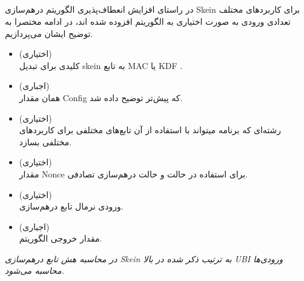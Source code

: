\subsection{}

در راستای افزایش انعطاف‌پذیری الگوریتم درهم‌سازی Skein برای کاربردهای مختلف تعدادی ورودی به صورت اختیاری به الگوریتم افزوده شده اند، در ادامه مختصرا به توضیح ایشان می‌پردازیم. 
\begin{itemize}
	\item
	      \textbf{}
	      (اختیاری)\\
	      کلیدی برای تبدیل skein
	      به تابع MAC یا KDF
	      .
	\item
	      \textbf{}
	      (اجباری)\\
	      همان مقدار Config که پیش‌تر توضیح داده شد. 
	\item
	      \textbf{}
	      (اختیاری)\\
	      رشته‌ای که برنامه میتواند با استفاده از آن تابع‌های مختلفی برای کاربردهای مختلفی بسازد. 
	\item
	      \textbf{
	      }(اختیاری)\\
	      مقدار Nonce برای استفاده در حالت 
	      و حالت درهم‌سازی تصادفی.
	\item
	      \textbf{
	      }
	      (اختیاری)\\  
	      ورودی نرمال تابع درهم‌‌سازی.
	      
	\item
	      \textbf{
	      }(اجباری)\\
	      مقدار خروجی الگوریتم. 
\end{itemize}

\textit{در محاسبه هش تابع درهم‌سازی 
	Skein
	به ترتیب ذکر شده در بالا 
	UBI
	ورودی‌ها محاسبه می‌شود.
}


\pagebreak
